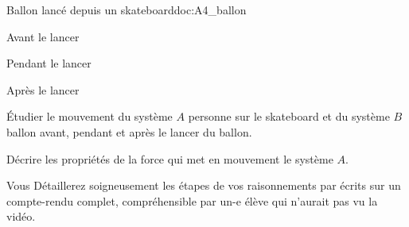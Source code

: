 \begin{doc}{Ballon lancé depuis un skateboard}{doc:A4_ballon}
  \begin{flushright}
    \vspace*{-18pt}
  \end{flushright}
  \begin{multicols}{3}
    \centering
    
    Avant le lancer
    

    Pendant le lancer
    

    Après le lancer
  \end{multicols}
\end{doc}



\numeroQuestion
Étudier le mouvement du système $A$ \og personne sur le skateboard \fg\; et du système $B$ \og ballon \fg\; avant, pendant et après le lancer du ballon.

\numeroQuestion
Décrire les propriétés de la force qui met en mouvement le système $A$.

\fleche Vous Détaillerez soigneusement les étapes de vos raisonnements par écrits sur un compte-rendu complet, compréhensible par un-e élève qui n'aurait pas vu la vidéo.

